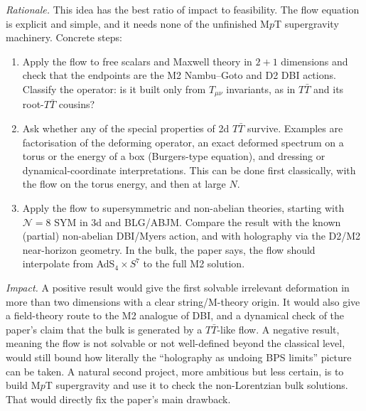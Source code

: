 \documentclass[11pt]{article}
\begin{document}
\emph{Rationale.} This idea has the best ratio of impact to feasibility. The flow equation is explicit and simple, and it needs none of the unfinished M$p$T supergravity machinery. Concrete steps:
\begin{enumerate}
\item Apply the flow to free scalars and Maxwell theory in $2+1$ dimensions and check that the endpoints are the M2 Nambu--Goto and D2 DBI actions. Classify the operator: is it built only from $T_{\mu\nu}$ invariants, as in $T\bar T$ and its root-$T\bar T$ cousins?
\item Ask whether any of the special properties of 2d $T\bar T$ survive. Examples are factorisation of the deforming operator, an exact deformed spectrum on a torus or the energy of a box (Burgers-type equation), and dressing or dynamical-coordinate interpretations. This can be done first classically, with the flow on the torus energy, and then at large $N$.
\item Apply the flow to supersymmetric and non-abelian theories, starting with $\mathcal N=8$ SYM in 3d and BLG/ABJM. Compare the result with the known (partial) non-abelian DBI/Myers action, and with holography via the D2/M2 near-horizon geometry. In the bulk, the paper says, the flow should interpolate from AdS$_4\times S^7$ to the full M2 solution.
\end{enumerate}
\emph{Impact.} A positive result would give the first solvable irrelevant deformation in more than two dimensions with a clear string/M-theory origin. It would also give a field-theory route to the M2 analogue of DBI, and a dynamical check of the paper's claim that the bulk is generated by a $T\bar T$-like flow. A negative result, meaning the flow is not solvable or not well-defined beyond the classical level, would still bound how literally the ``holography as undoing BPS limits'' picture can be taken. A natural second project, more ambitious but less certain, is to build M$p$T supergravity and use it to check the non-Lorentzian bulk solutions. That would directly fix the paper's main drawback.
\end{document}
